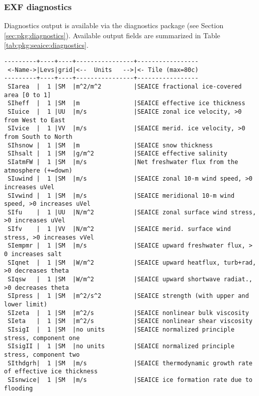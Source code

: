 
\subsubsection{EXF diagnostics
\label{sec:pkg:seaice:diagnostics}}

Diagnostics output is available via the diagnostics package
(see Section \ref{sec:pkg:diagnostics}).
Available output fields are summarized in 
Table \ref{tab:pkg:seaice:diagnostics}.

\begin{table}[h!]
\centering
\label{tab:pkg:seaice:diagnostics}
{\footnotesize
\begin{verbatim}
---------+----+----+----------------+-----------------
 <-Name->|Levs|grid|<--  Units   -->|<- Tile (max=80c)
---------+----+----+----------------+-----------------
 SIarea  |  1 |SM  |m^2/m^2         |SEAICE fractional ice-covered area [0 to 1]
 SIheff  |  1 |SM  |m               |SEAICE effective ice thickness
 SIuice  |  1 |UU  |m/s             |SEAICE zonal ice velocity, >0 from West to East
 SIvice  |  1 |VV  |m/s             |SEAICE merid. ice velocity, >0 from South to North
 SIhsnow |  1 |SM  |m               |SEAICE snow thickness
 SIhsalt |  1 |SM  |g/m^2           |SEAICE effective salinity
 SIatmFW |  1 |SM  |m/s             |Net freshwater flux from the atmosphere (+=down)
 SIuwind |  1 |SM  |m/s             |SEAICE zonal 10-m wind speed, >0 increases uVel
 SIvwind |  1 |SM  |m/s             |SEAICE meridional 10-m wind speed, >0 increases uVel
 SIfu    |  1 |UU  |N/m^2           |SEAICE zonal surface wind stress, >0 increases uVel
 SIfv    |  1 |VV  |N/m^2           |SEAICE merid. surface wind stress, >0 increases vVel
 SIempmr |  1 |SM  |m/s             |SEAICE upward freshwater flux, > 0 increases salt
 SIqnet  |  1 |SM  |W/m^2           |SEAICE upward heatflux, turb+rad, >0 decreases theta
 SIqsw   |  1 |SM  |W/m^2           |SEAICE upward shortwave radiat., >0 decreases theta
 SIpress |  1 |SM  |m^2/s^2         |SEAICE strength (with upper and lower limit)
 SIzeta  |  1 |SM  |m^2/s           |SEAICE nonlinear bulk viscosity
 SIeta   |  1 |SM  |m^2/s           |SEAICE nonlinear shear viscosity
 SIsigI  |  1 |SM  |no units        |SEAICE normalized principle stress, component one
 SIsigII |  1 |SM  |no units        |SEAICE normalized principle stress, component two
 SIthdgrh|  1 |SM  |m/s             |SEAICE thermodynamic growth rate of effective ice thickness
 SIsnwice|  1 |SM  |m/s             |SEAICE ice formation rate due to flooding

\end{verbatim}}
\end{table}
